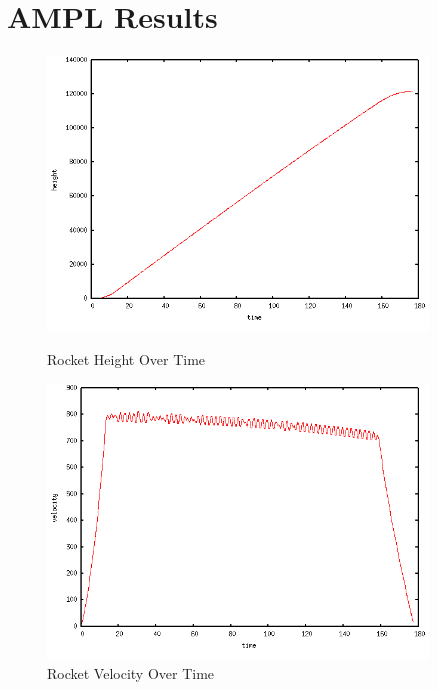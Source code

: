 \documentclass{article}
\begin{document}
\section{AMPL Results}\label{AMPL Results}

\begin{figure}
\centering
\includegraphics[width=0.9\textwidth]{homework5a_height.png}
\caption{Rocket Height Over Time}
\vspace{2 cm}
\includegraphics[width=0.9\textwidth]{homework5a_velocity.png}
\caption{Rocket Velocity Over Time}
\end{figure}
\end{document}

